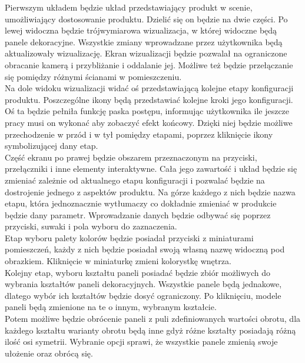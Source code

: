 \documentclass{article} %
\begin{document}
        Pierwszym układem będzie układ przedstawiający produkt w scenie, umożliwiający dostosowanie produktu. Dzielić się on będzie na dwie części. Po lewej widoczna będzie trójwymiarowa wizualizacja, w której widoczne będą panele dekoracyjne. Wszystkie zmiany wprowadzane przez użytkownika będą aktualizowały wizualizację. Ekran wizualizacji będzie pozwalał na ograniczone obracanie kamerą i przybliżanie i oddalanie jej. Możliwe też będzie przełączanie się pomiędzy różnymi ścianami w pomieszczeniu.
        \\
        
        Na dole widoku wizualizacji widać oś przedstawiającą kolejne etapy konfiguracji produktu. Poszczególne ikony będą przedstawiać kolejne kroki jego konfiguracji. Oś ta będzie pełniła funkcję paska postępu, informując użytkownika ile jeszcze pracy musi on wykonać aby zobaczyć efekt końcowy. Dzięki niej będzie możliwe przechodzenie w przód i w tył pomiędzy etapami, poprzez kliknięcie ikony symbolizującej dany etap.
        \\
        
        Część ekranu po prawej będzie obszarem przeznaczonym na przyciski, przełączniki i inne elementy interaktywne. Cała jego zawartość i układ będzie się zmieniać zależnie od aktualnego etapu konfiguracji i pozwalać będzie na dostrojenie jednego z aspektów produktu. Na górze każdego z nich będzie nazwa etapu, która jednoznacznie wytłumaczy co dokładnie zmieniać w produkcie będzie dany parametr. Wprowadzanie danych będzie odbywać się poprzez przyciski, suwaki i pola wyboru do zaznaczenia.
        \\
        
        Etap wyboru palety kolorów będzie posiadał przyciski z miniaturami pomieszczeń, każdy z nich będzie posiadał swoją własną nazwę widoczną pod obrazkiem. Kliknięcie w miniaturkę zmieni kolorystkę wnętrza. 
        \\
        
        Kolejny etap, wyboru kształtu paneli posiadać będzie zbiór możliwych do wybrania kształtów paneli dekoracyjnych. Wszystkie panele będą jednakowe, dlatego wybór ich kształtów będzie dosyć ograniczony. Po kliknięciu, modele paneli będą zmienione na te o innym, wybranym kształcie.
        \\
        
        Potem możliwe będzie obrócenie paneli z puli zdefiniowanych wartości obrotu, dla każdego kształtu warianty obrotu będą inne gdyż różne kształty posiadają różną ilość osi symetrii. Wybranie opcji sprawi, że wszystkie panele zmienią swoje ułożenie oraz obrócą się.
        \\
        
\end{document}
